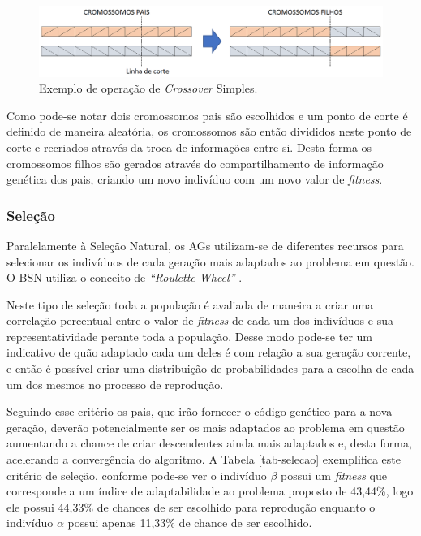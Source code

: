 \begin{figure} [!htb]%
	\centering
	\includegraphics[width=1\textwidth]{./figuras/crossover.png}
	\caption[Exemplo de \emph{Crossover}]{Exemplo de operação de \emph{Crossover} Simples.}
	\label{fig_crossover}
\end{figure}

Como pode-se notar dois cromossomos pais são escolhidos e um ponto de corte é definido de maneira aleatória, os cromossomos são então divididos neste ponto de corte e recriados através da troca de informações entre si. Desta forma os cromossomos filhos são gerados através do compartilhamento de informação genética dos pais, criando um novo indivíduo com um novo valor de \emph{fitness}.

\subsubsection{Seleção}
\label{cap-selecao}
Paralelamente à Seleção Natural, os AGs utilizam-se de diferentes recursos para selecionar os indivíduos de cada geração mais adaptados ao problema em questão. O BSN utiliza o conceito de \emph{``Roulette Wheel''} \cite{Goldberg1889}. 

Neste tipo de seleção toda a população é avaliada de maneira a criar uma correlação percentual entre o valor de \emph{fitness} de cada um dos indivíduos e sua representatividade perante toda a população. Desse modo pode-se ter um indicativo de quão adaptado cada um deles é com relação a sua geração corrente, e então é possível criar uma distribuição de probabilidades para a escolha de cada um dos mesmos no processo de reprodução.

Seguindo esse critério os pais, que irão fornecer o código genético para a nova geração, deverão potencialmente ser os mais adaptados ao problema em questão aumentando a chance de criar descendentes ainda mais adaptados e, desta forma, acelerando a convergência do algoritmo. A Tabela \ref{tab-selecao} exemplifica este critério de seleção, conforme pode-se ver o indivíduo $\beta$ possui um \emph{fitness} que corresponde a um índice de adaptabilidade ao problema proposto de 43,44\%, logo ele possui 44,33\% de chances de ser escolhido para reprodução enquanto o indivíduo $\alpha$ possui apenas 11,33\% de chance de ser escolhido.

